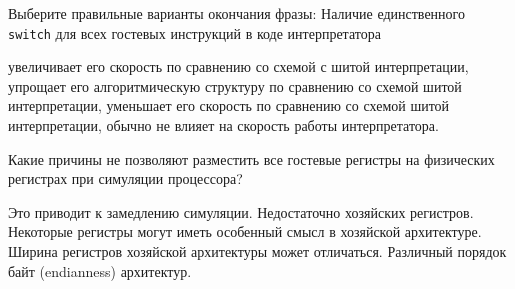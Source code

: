 \begin{questions}
\question[3] Выберите правильные варианты окончания фразы: Наличие единственного \texttt{switch} для всех гостевых инструкций в коде интерпретатора
\begin{choices}
    \choice увеличивает его скорость по сравнению со схемой с шитой интерпретации,
    \correctchoice упрощает его алгоритмическую структуру по сравнению со схемой шитой интерпретации,
    \correctchoice уменьшает его скорость по сравнению со схемой шитой интерпретации,
    \choice обычно не влияет на скорость работы интерпретатора.
\end{choices}

\question[3] Какие причины не позволяют разместить все гостевые регистры на физических регистрах при симуляции процессора?
\begin{choices}
    \choice Это приводит к замедлению симуляции.
    \correctchoice Недостаточно хозяйских регистров.
    \correctchoice Некоторые регистры могут иметь особенный смысл в хозяйской архитектуре.
    \correctchoice Ширина регистров хозяйской архитектуры может отличаться.
    \choice Различный порядок байт (endianness) архитектур.
\end{choices}

\end{questions}


